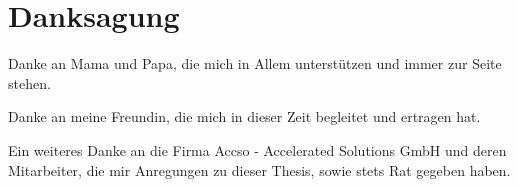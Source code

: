
\bigskip

\begingroup
\let\clearpage\relax
\let\cleardoublepage\relax
\let\cleardoublepage\relax
\chapter*{Danksagung}

\begin{center}
Danke an Mama und Papa, die mich in Allem unterstützen und immer zur Seite stehen.


Danke an meine Freundin, die mich in dieser Zeit begleitet und ertragen hat.

Ein weiteres Danke an die Firma Accso - Accelerated Solutions GmbH und deren Mitarbeiter, die 
mir Anregungen zu dieser Thesis, sowie stets Rat gegeben haben.
\end{center}

\endgroup



